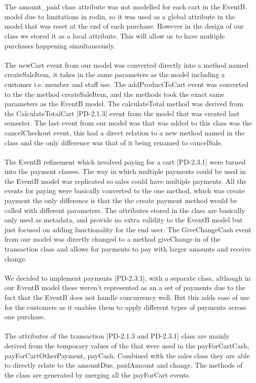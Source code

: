\documentclass[a4paper]{article}
\begin{document}
\\\\
The amount\_paid class attribute was not modelled for each cart in the EventB model due to limitations in rodin, so it was used as a global attribute in the model that was reset at the end of each purchase. However in the design of our class we stored it as a local attribute. This will allow us to have multiple purchases happening simultaneously.
\\\\
The newCart event from our model was converted directly into a method named createSaleItem, it takes in the same parameters as the model including a customer i.e. member and staff use. The addProductToCart event was converted to the the method createSaleItem, and the methods took the exact same parameters as the EventB model. The calculateTotal method was derived from the CalculateTotalCart [PD-2.1.3] event from the model that was created last semester.  The last event from our model was that was added to this class was the cancelCheckout event, this had a direct relation to a new method named in the class and the only difference was that of it being renamed to cancelSale.
\\\\
The EventB refinement which involved paying for a cart [PD-2.3.1] were turned into the payment classes. The way in which multiple payments could be used in the EventB model was replicated so sales could have multiple payments. All the events for paying were basically converted to the one method, which was create payment the only difference is that the the create payment method would be called with different parameters. The attributes stored in the class are basically only used as metadata, and provide no extra validity to the EventB model but just focused on adding functionality for the end user. The GiveChangeCash event from our model was directly changed to a method giveChange in of the transaction class and allows for payments to pay with larger amounts and receive change.
\\\\
We decided to implement payments [PD-2.3.1], with a separate class, although in our EventB model these weren't represented as an a set of payments due to the fact that the EventB does not handle concurrency well. But this adds ease of use for the customers as it enables them to apply different types of payments  across one purchase. 
\\\\
The attributes of the transaction [PD-2.1.3 and PD-2.3.1] class are mainly derived from the temporary values of the that were used in the payForCartCash, payForCartOtherPayment, payCash. Combined with the sales class they are able to directly relate to the amountDue, paidAmount and change. The methods of the class are generated by merging all the payForCart events.
\end{document}
